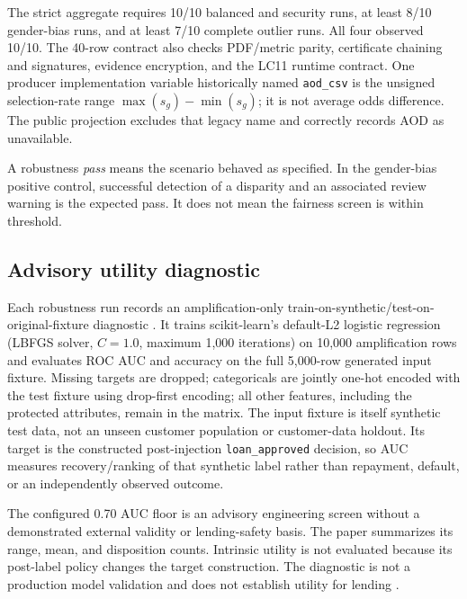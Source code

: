 The strict aggregate requires 10/10 balanced and security runs, at least 8/10 gender-bias runs, and
at least 7/10 complete outlier runs. All four observed 10/10. The 40-row contract also checks
PDF/metric parity, certificate chaining and signatures, evidence encryption, and the LC11 runtime
contract. One producer implementation variable historically named \texttt{aod\_csv} is the
unsigned selection-rate range $\max(s_g)-\min(s_g)$; it is not average odds difference. The public
projection excludes that legacy name and correctly records AOD as unavailable.

A robustness \emph{pass} means the scenario behaved as specified. In the gender-bias positive
control, successful detection of a disparity and an associated review warning is the expected pass.
It does not mean the fairness screen is within threshold.

\subsection{Advisory utility diagnostic}

Each robustness run records an amplification-only train-on-synthetic/test-on-original-fixture
diagnostic \citep{esteban2017realvalued}. It trains scikit-learn's default-L2 logistic regression
(LBFGS solver, $C=1.0$, maximum 1,000 iterations) on 10,000 amplification rows and evaluates ROC
AUC and accuracy on the full 5,000-row generated input fixture. Missing targets are dropped;
categoricals are jointly one-hot encoded with the test fixture using drop-first encoding; all other
features, including the protected attributes, remain in the matrix. The input fixture is itself
synthetic test data, not an unseen customer population or customer-data holdout. Its target is the
constructed post-injection \texttt{loan\_approved} decision, so AUC measures recovery/ranking of
that synthetic label rather than repayment, default, or an independently observed outcome.

The configured 0.70 AUC floor is an advisory engineering screen without a demonstrated external
validity or lending-safety basis. The paper summarizes its range, mean, and disposition counts.
Intrinsic utility is not evaluated because its post-label policy changes the target construction.
The diagnostic is not a production model validation and does not establish utility for lending
\citep{fawcett2006roc}.
